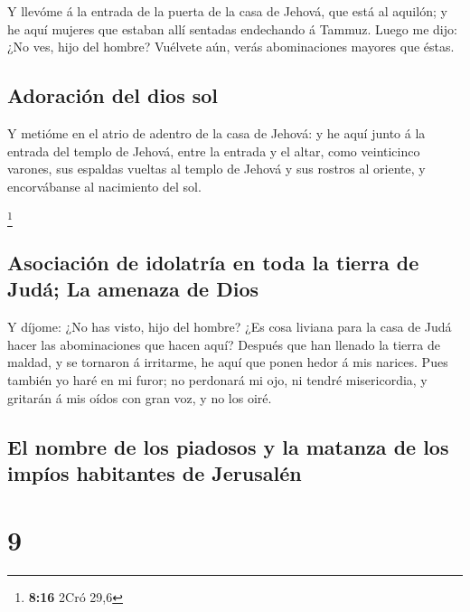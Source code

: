  Y llevóme á la entrada de la puerta de la casa de Jehová,
que está al aquilón; y he aquí mujeres que estaban allí sentadas
endechando á Tammuz.  Luego me dijo: ¿No ves, hijo del
hombre? Vuélvete aún, verás abominaciones mayores que éstas.

\hypertarget{adoraciuxf3n-del-dios-sol}{%
\subsection{Adoración del dios sol}\label{adoraciuxf3n-del-dios-sol}}

 Y metióme en el atrio de adentro de la casa de Jehová: y
he aquí junto á la entrada del templo de Jehová, entre la entrada y el
altar, como veinticinco varones, sus espaldas vueltas al templo de
Jehová y sus rostros al oriente, y encorvábanse al nacimiento del sol.

\footnote{\textbf{8:16} 2Cró 29,6}

\hypertarget{asociaciuxf3n-de-idolatruxeda-en-toda-la-tierra-de-juduxe1-la-amenaza-de-dios}{%
\subsection{Asociación de idolatría en toda la tierra de Judá; La
amenaza de
Dios}\label{asociaciuxf3n-de-idolatruxeda-en-toda-la-tierra-de-juduxe1-la-amenaza-de-dios}}

 Y díjome: ¿No has visto, hijo del hombre? ¿Es cosa liviana
para la casa de Judá hacer las abominaciones que hacen aquí? Después que
han llenado la tierra de maldad, y se tornaron á irritarme, he aquí que
ponen hedor á mis narices.  Pues también yo haré en mi
furor; no perdonará mi ojo, ni tendré misericordia, y gritarán á mis
oídos con gran voz, y no los oiré.

\hypertarget{el-nombre-de-los-piadosos-y-la-matanza-de-los-impuxedos-habitantes-de-jerusaluxe9n}{%
\subsection{El nombre de los piadosos y la matanza de los impíos
habitantes de
Jerusalén}\label{el-nombre-de-los-piadosos-y-la-matanza-de-los-impuxedos-habitantes-de-jerusaluxe9n}}

\hypertarget{section-8}{%
\section{9}\label{section-8}}

